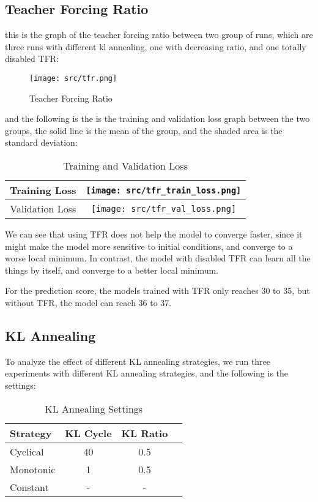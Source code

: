 \subsection{Teacher Forcing Ratio}
this is the graph of the teacher forcing ratio between two group of runs, which are three runs with different kl annealing, one with decreasing ratio, and one totally disabled TFR:

\begin{figure}[H]
    \centering
    \texttt{[image: src/tfr.png]}
    \caption{Teacher Forcing Ratio}
\end{figure}

and the following is the is the training and validation loss graph between the two groups, the solid line is the mean of the group, and the shaded area is the standard deviation:

\begin{table}[H]
    \centering
    \begin{tabular}{|c|c|}
        \hline
        Training Loss & \texttt{[image: src/tfr\_train\_loss.png]} \\
        \hline
        Validation Loss & \texttt{[image: src/tfr\_val\_loss.png]} \\
        \hline
    \end{tabular}
    \caption{Training and Validation Loss}
\end{table}

We can see that using TFR does not help the model to converge faster, since it might make the model more sensitive to initial conditions, and converge to a worse local minimum.
In contrast, the model with disabled TFR can learn all the things by itself, and converge to a better local minimum.

For the prediction score, the models trained with TFR only reaches 30 to 35, but without TFR, the model can reach 36 to 37.

\subsection{KL Annealing}
To analyze the effect of different KL annealing strategies, we run three experiments with different KL annealing strategies, and the following is the settings:

\begin{table}[H]
    \centering
    \begin{tabular}{|l|c|c|c|}
        \hline
        Strategy & KL Cycle & KL Ratio \\
        \hline
        Cyclical & 40 & 0.5 \\
        Monotonic &1 & 0.5 \\
        Constant & - & - \\
        \hline
    \end{tabular}
    \caption{KL Annealing Settings}
\end{table}


